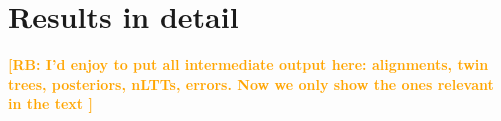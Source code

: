 \documentclass{article}
\newcommand{\richel}[1]{\textcolor{orange}{\textbf{[RB: #1]}}}
\begin{document}



\appendix

\section{Results in detail}

\richel{
  I'd enjoy to put all intermediate output here: alignments, twin trees,
  posteriors, nLTTs, errors. Now we only show the ones relevant in the text
}












\end{document}
